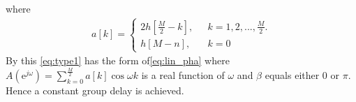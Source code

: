 where 
\begin{align}
a[k]= \left\{ \begin{matrix}
2h\left[ \frac{M}{2} - k \right], \ \ &\ k=1,2,... , \frac{M}{2}.   \\
h[M-n], \ \ &\ k = 0  
\end{matrix}\right.
\end{align}
By this \eqref{eq:type1} has the form of\eqref{eq:lin_pha} where $A(\text{e}^{j\omega})= \sum_{k=0}^{\frac{M}{2}} a[k]\cos \omega k$ is a real function of $\omega$ and $\beta$ equals either 0 or $\pi$. Hence a constant group delay is achieved.








   
 


 



